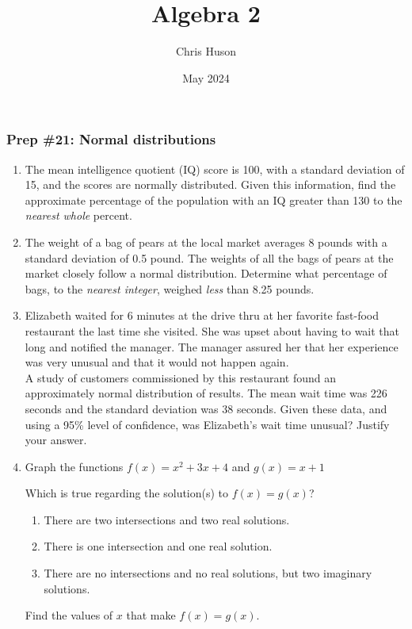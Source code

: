 \documentclass[12pt, twoside]{article}
\title{Algebra 2}
\author{Chris Huson}
\date{May 2024}
\begin{document}
\subsubsection*{Prep \#21: Normal distributions}
\begin{enumerate}[itemsep=0.5cm]
\item The mean intelligence quotient (IQ) score is 100, with a standard deviation of 15, and the scores are normally distributed. Given this information, find the approximate percentage of the population with an IQ greater than 130 to the \emph{nearest whole} percent. \vspace{3cm}

\item The weight of a bag of pears at the local market averages 8 pounds with a standard deviation of 0.5 pound. The weights of all the bags of pears at the market closely follow a normal distribution. Determine what percentage of bags, to the \emph{nearest integer}, weighed \emph{less} than 8.25 pounds.\vspace{3cm}

\item Elizabeth waited for 6 minutes at the drive thru at her favorite fast-food restaurant the last time she visited. She was upset about having to wait that long and notified the manager. The manager assured her that her experience was very unusual and that it would not happen again. \\[0.25cm]
A study of customers commissioned by this restaurant found an approximately normal distribution of results. The mean wait time was 226 seconds and the standard deviation was 38 seconds. Given these data, and using a 95\% level of confidence, was Elizabeth's wait time unusual? Justify your answer. %


\newpage
\item Graph the functions $f(x) = x^2+3x+4$ and $g(x) = x+1$
\begin{center}
    \end{center}
    Which is true regarding the solution(s) to $f(x)=g(x)$?
    \begin{enumerate}
        \item There are two intersections and two real solutions.
        \item There is one intersection and one real solution.
        \item There are no intersections and no real solutions, but two imaginary solutions.
    \end{enumerate}
    Find the values of $x$ that make $f(x)=g(x)$.


\end{enumerate}
\end{document}
